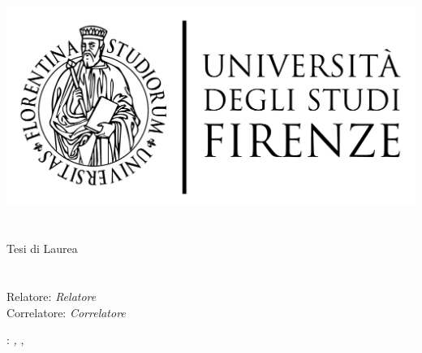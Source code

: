 \begin{titlepage}
	\begin{center}
   	\large
      \hfill
      \vfill
      \begingroup
         \includegraphics[scale=0.15]{static/logo/LOGO}\\
			\myFaculty \\
			\myDegree \\ 
			\vspace{0.5cm}
         \vspace{0.5cm}    
         Tesi di Laurea    
      \endgroup 
      \vfill 
      \begingroup
      	\color{Maroon}\spacedallcaps{\myItalianTitle} \\ $\ $\\
      	\spacedallcaps{\myEnglishTitle} \\ 	
	\bigskip
      \endgroup
      \spacedlowsmallcaps{\myName}
      \vfill 
      \vfill
      Relatore: \emph{Relatore}\\
      Correlatore: \emph{Correlatore}\\
      \vfill
      \vfill
      \myTime
      \vfill                      
	\end{center}        
\end{titlepage}   
   \newpage
	\thispagestyle{empty}
	\hfill
	\vfill
	\noindent\myName: 
	\textit{\myItalianTitle,} 
	\myDegree, \textcopyright\ \myTime
